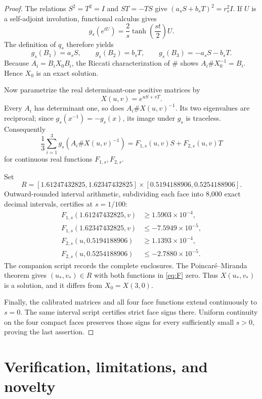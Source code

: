 \documentclass[11pt]{article}
\begin{document}
\begin{proof}
The relations \(S^2=T^2=I\) and \(ST=-TS\) give
\((a_sS+b_sT)^2=r_s^2I\).  If \(U\) is a self-adjoint involution, functional
calculus gives
\[
 g_s(e^{tU})=\frac2s\tanh\!\left(\frac{st}{2}\right)U.
\]
The definition of \(q_s\) therefore yields
\[
 g_s(B_1)=a_sS,\qquad g_s(B_2)=b_sT,\qquad
 g_s(B_3)=-a_sS-b_sT.
\]
Because \(A_i=B_iX_0B_i\), the Riccati characterization of \(\#\) shows
\(A_i\#X_0^{-1}=B_i\).  Hence \(X_0\) is an exact solution.

Now parametrize the real determinant-one positive matrices by
\[
 X(u,v)=e^{uS+vT}.
\]
Every \(A_i\) has determinant one, so does \(A_i\#X(u,v)^{-1}\).  Its two
eigenvalues are reciprocal; since \(g_s(x^{-1})=-g_s(x)\), its image under
\(g_s\) is traceless.  Consequently
\begin{equation}\label{eq:F}
 \frac13\sum_{i=1}^3g_s(A_i\#X(u,v)^{-1})
 =F_{1,s}(u,v)S+F_{2,s}(u,v)T
\end{equation}
for continuous real functions \(F_{1,s},F_{2,s}\).

Set
\[
 R=[1.61247432825,1.62347432825]
 \times[0.5194188906,0.5254188906].
\]
Outward-rounded interval arithmetic, subdividing each face into 8,000 exact
decimal intervals, certifies at \(s=1/100\):
\begin{align*}
 F_{1,s}(1.61247432825,v)&\ge1.5903\times10^{-4},\\
 F_{1,s}(1.62347432825,v)&\le-7.5949\times10^{-5},\\
 F_{2,s}(u,0.5194188906)&\ge1.1393\times10^{-4},\\
 F_{2,s}(u,0.5254188906)&\le-2.7880\times10^{-5}.
\end{align*}
The companion script records the complete enclosures.  The
Poincar\'e--Miranda theorem gives \((u_*,v_*)\in R\) with both functions in
\eqref{eq:F} zero.  Thus \(X(u_*,v_*)\) is a solution, and it differs from
\(X_0=X(3,0)\).

Finally, the calibrated matrices and all four face functions extend
continuously to \(s=0\).  The same interval script certifies strict face
signs there.  Uniform continuity on the four compact faces preserves those
signs for every sufficiently small \(s>0\), proving the last assertion.
\end{proof}

\section{Verification, limitations, and novelty}
\end{document}
